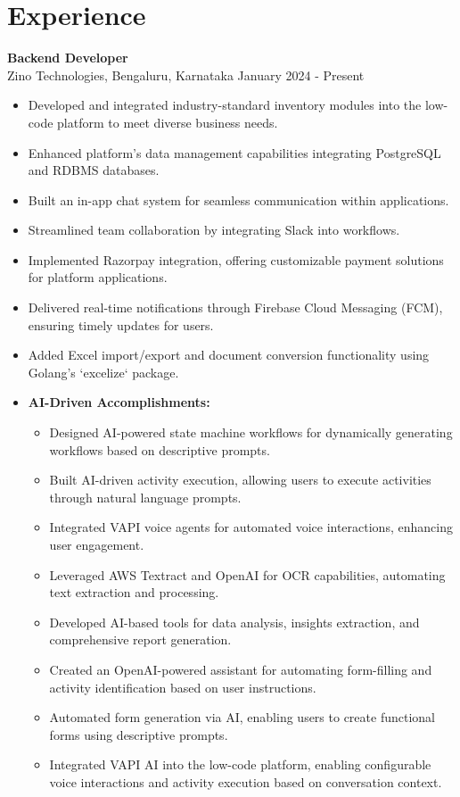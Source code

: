 \documentclass[a4paper,15pt]{article}
\begin{document}
\section*{Experience}
\textbf{Backend Developer} \\
Zino Technologies, Bengaluru, Karnataka \hfill January 2024 - Present
\begin{itemize}[noitemsep, topsep=0pt, leftmargin=*]
    \item Developed and integrated industry-standard inventory modules into the low-code platform to meet diverse business needs.
    \item Enhanced platform's data management capabilities integrating PostgreSQL and RDBMS databases.
    \item Built an in-app chat system for seamless communication within applications.
    \item Streamlined team collaboration by integrating Slack into workflows.
    \item Implemented Razorpay integration, offering customizable payment solutions for platform applications.
    \item Delivered real-time notifications through Firebase Cloud Messaging (FCM), ensuring timely updates for users.
    \item Added Excel import/export and document conversion functionality using Golang's `excelize` package.

    \item \textbf{AI-Driven Accomplishments:}
    \begin{itemize}[noitemsep, topsep=0pt, leftmargin=*]
        \item Designed AI-powered state machine workflows for dynamically generating workflows based on descriptive prompts.
        \item Built AI-driven activity execution, allowing users to execute activities through natural language prompts.
        \item Integrated VAPI voice agents for automated voice interactions, enhancing user engagement.
        \item Leveraged AWS Textract and OpenAI for OCR capabilities, automating text extraction and processing.
        \item Developed AI-based tools for data analysis, insights extraction, and comprehensive report generation.
        \item Created an OpenAI-powered assistant for automating form-filling and activity identification based on user instructions.
        \item Automated form generation via AI, enabling users to create functional forms using descriptive prompts.
        \item Integrated VAPI AI into the low-code platform, enabling configurable voice interactions and activity execution based on conversation context.
    \end{itemize}
\end{itemize}
\end{document}
